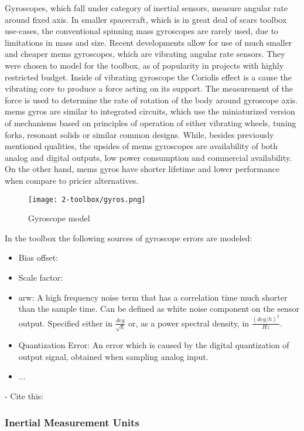         Gyroscopes, which fall under category of inertial sensors, measure angular rate around fixed axis. In smaller spacecraft, which is in great deal of \ac{scars} toolbox use-cases, the conventional spinning mass gyroscopes are rarely used, due to limitations in mass and size. Recent developments allow for use of much smaller and cheaper \ac{mems} gyroscopes, which are vibrating angular rate sensors. They were chosen to model for the toolbox, as of popularity in projects with highly restricted budget. \cite{armenise2010advances} Inside of vibrating gyroscope the Coriolis effect is a cause the vibrating core to produce a force acting on its support. The measurement of the force is used to determine the rate of rotation of the body around gyroscope axis. \ac{mems} gyros are similar to integrated circuits, which use the miniaturized version of mechanisms based on principles of operation of either vibrating wheels, tuning forks, resonant solids or similar common designs. \cite{bernstein2003overview} While, besides previously mentioned qualities, the upsides of \ac{mems} gyroscopes are availability of both analog and digital outputs, low power consumption and commercial availability. On the other hand, \ac{mems} gyros have shorter lifetime and lower performance when compare to pricier alternatives.

        \begin{figure}[H]
            \centering
            \texttt{[image: 2-toolbox/gyros.png]}
            \caption{Gyroscope model}
            \label{fig:gryo_simulink}
        \end{figure}

        In the toolbox the following sources of gyroscope errors are modeled:
        \begin{itemize}
            \item Bias offset:
            \item Scale factor: 
            \item \ac{arw}: A high frequency noise term that has a correlation time much shorter than the sample time. Can be defined as white noise component on the sensor output. Specified either in $\frac{deg}{\sqrt{h}}$ or, as a power spectral density, in $\frac{(deg/h)^2}{Hz}$. %
            \item Quantization Error: An error which is caused by the digital quantization of output signal, obtained when sampling analog input.
            \item ...
        \end{itemize}

       - Cite this: \cite{kapeelmodeling} %



    \subsubsection{Inertial Measurement Units}

